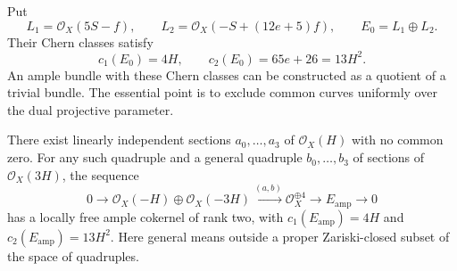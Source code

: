 Put
\[
 L_1=\mathcal O_X(5S-f),\qquad
 L_2=\mathcal O_X(-S+(12e+5)f),\qquad
 E_0=L_1\oplus L_2.
\]
Their Chern classes satisfy
\[
 c_1(E_0)=4H,\qquad c_2(E_0)=65e+26=13H^2.
\]
An ample bundle with these Chern classes can be constructed as a quotient of a trivial bundle. The essential point is to exclude common curves uniformly over the dual projective parameter.

\begin{proposition}\label{prop:hirzebruch-ample-comparison}
There exist linearly independent sections $a_0,\ldots,a_3$ of $\mathcal O_X(H)$ with no common zero. For any such quadruple and a general quadruple $b_0,\ldots,b_3$ of sections of $\mathcal O_X(3H)$, the sequence
\[
 0\longrightarrow\mathcal O_X(-H)\oplus\mathcal O_X(-3H)
 \xrightarrow{(a,b)}\mathcal O_X^{\oplus4}
 \longrightarrow E_{\mathrm{amp}}\longrightarrow0
\]
has a locally free ample cokernel of rank two, with $c_1(E_{\mathrm{amp}})=4H$ and $c_2(E_{\mathrm{amp}})=13H^2$. Here general means outside a proper Zariski-closed subset of the space of quadruples.
\end{proposition}
